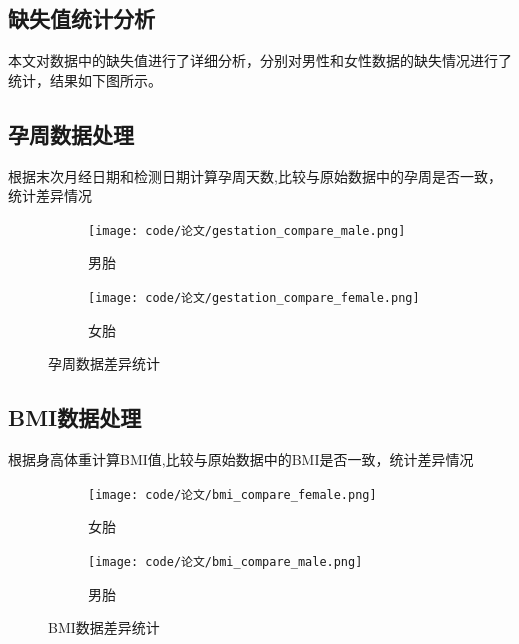 \documentclass[12pt,a4paper]{ctexart}
\numberwithin{equation}{section}
\theoremstyle{mcm}
\begin{document}
\subsection{缺失值统计分析}
本文对数据中的缺失值进行了详细分析，分别对男性和女性数据的缺失情况进行了统计，结果如下图所示。
\subsection{孕周数据处理}
根据末次月经日期和检测日期计算孕周天数,比较与原始数据中的孕周是否一致，统计差异情况
\begin{figure}[htbp]
    \centering
    \begin{subfigure}{0.45\textwidth}
        \texttt{[image: code/论文/gestation\_compare\_male.png]}
        \caption{男胎}
    \end{subfigure}
    \hfill
    \begin{subfigure}{0.45\textwidth}
        \texttt{[image: code/论文/gestation\_compare\_female.png]}
        \caption{女胎}
    \end{subfigure}
    \caption{孕周数据差异统计}
    \label{fig:missing_analysis}
\end{figure}
\subsection{BMI数据处理}
根据身高体重计算BMI值,比较与原始数据中的BMI是否一致，统计差异情况
\begin{figure}[htbp]
    \centering
    \begin{subfigure}{0.45\textwidth}
        \texttt{[image: code/论文/bmi\_compare\_female.png]}
        \caption{女胎}
    \end{subfigure}
    \hfill
    \begin{subfigure}{0.45\textwidth}
        \texttt{[image: code/论文/bmi\_compare\_male.png]}
        \caption{男胎}
    \end{subfigure}
    \caption{BMI数据差异统计}
    \label{fig:missing_analysis}
\end{figure}
\end{document}
